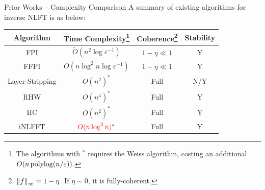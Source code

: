 \begin{frame}{Prior Works -- Complexity Comparison}
    A summary of existing algorithms for inverse NLFT is as below:
    \begin{table}
        \centering
        \begin{tabular}{|c||c|c|c|}
            \hline
            Algorithm & Time Complexity\footnote{The algorithms with $^*$ requires the Weiss algorithm, costing an additional $O(n\operatorname{\mathrm{polylog}} (n/\varepsilon))$.} & Coherence\footnote{$\left\lVert{f}\right\rVert_\infty = 1-\eta$. If $\eta\sim0$, it is fully-coherent.\vspace{2.5ex}} & Stability\\ \hline\hline
            FPI \cite{FPI} & $\tilde{O}(n^2\log\varepsilon^{-1})$ & $1-\eta\ll1$ & Y \\
            FFPI \cite{half-cholesky} & $O(n\log^2n\log\varepsilon^{-1})$ & $1-\eta\ll1$ & Y \\ \hline
            Layer-Stripping \cite{Tsai} & $O(n^2)^*$ & Full & N/Y \\
            RHW \cite{Szego} & $O(n^4)^*$ & Full & Y \\ 
            HC \cite{half-cholesky} & $O(n^2)^*$ & Full & Y \\ \hline
            iNLFFT \cite{Lin2025} & ${\color{red}O(n\log^2n)}^*$ & Full & Y \\ \hline
        \end{tabular}
    \end{table}
\end{frame}







